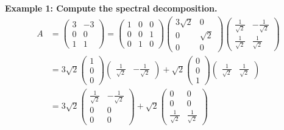 \noindent
\newline
\textbf{Example 1: Compute the spectral decomposition.}
\begin{align}
    A &= \begin{pmatrix}
        3 & -3 \\ 0 & 0 \\ 1 & 1
    \end{pmatrix} = \begin{pmatrix}
        1 & 0 & 0 \\ 0 & 0 & 1 \\ 0 & 1 & 0
    \end{pmatrix}
    \begin{pmatrix}
        3\sqrt{2} & 0 \\ 0 & \sqrt{2} \\ 0 & 0
    \end{pmatrix} \begin{pmatrix}
        \frac{1}{\sqrt{2}} & -\frac{1}{\sqrt{2}} \\
        \frac{1}{\sqrt{2}} & \frac{1}{\sqrt{2}}
    \end{pmatrix} \\
    &= 3\sqrt{2} \begin{pmatrix}
        1 \\ 0 \\ 0
    \end{pmatrix} \begin{pmatrix}
        \frac{1}{\sqrt{2}} & -\frac{1}{\sqrt{2}}
    \end{pmatrix}
    + \sqrt{2} \begin{pmatrix}
        0 \\ 0 \\ 1
    \end{pmatrix} \begin{pmatrix}
        \frac{1}{\sqrt{2}} & \frac{1}{\sqrt{2}}
    \end{pmatrix} \\
    &= 3 \sqrt{2} \begin{pmatrix}
        \frac{1}{\sqrt{2}} & -\frac{1}{\sqrt{2}} \\ 0 & 0 \\ 0 & 0
    \end{pmatrix} + \sqrt{2} \begin{pmatrix}
        0 & 0 \\ 0 & 0 \\ \frac{1}{\sqrt{2}} & \frac{1}{\sqrt{2}}
    \end{pmatrix}
\end{align}

